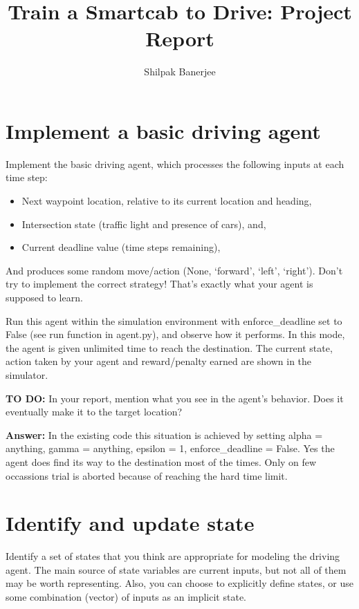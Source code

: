 \documentclass{article}
\title{Train a Smartcab to Drive: Project Report}
\author{Shilpak Banerjee}
\begin{document}
\maketitle


\section{Implement a basic driving agent}

Implement the basic driving agent, which processes the following inputs at each time step:
\begin{itemize}
\item Next waypoint location, relative to its current location and heading,
\item Intersection state (traffic light and presence of cars), and,
\item Current deadline value (time steps remaining),
\end{itemize}
And produces some random move/action (None, `forward', `left', `right'). Don’t try to implement the correct strategy! That’s exactly what your agent is supposed to learn.

Run this agent within the simulation environment with enforce\_deadline set to False (see run function in agent.py), and observe how it performs. In this mode, the agent is given unlimited time to reach the destination. The current state, action taken by your agent and reward/penalty earned are shown in the simulator.

\vspace{.5cm}

\noindent\textbf{TO DO:} In your report, mention what you see in the agent’s behavior. Does it eventually make it to the target location?

\vspace{.2cm}

\noindent\textbf{Answer:}  In the existing code this situation is achieved by setting alpha = anything, gamma = anything, epsilon = 1, enforce\_deadline = False. Yes the agent does find its way to the destination most of the times. Only on few occassions trial is aborted because of reaching the hard time limit.  



\section{Identify and update state}

Identify a set of states that you think are appropriate for modeling the driving agent. The main source of state variables are current inputs, but not all of them may be worth representing. Also, you can choose to explicitly define states, or use some combination (vector) of inputs as an implicit state.
\end{document}
